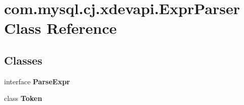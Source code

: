 \hypertarget{classcom_1_1mysql_1_1cj_1_1xdevapi_1_1_expr_parser}{}\section{com.\+mysql.\+cj.\+xdevapi.\+Expr\+Parser Class Reference}
\label{classcom_1_1mysql_1_1cj_1_1xdevapi_1_1_expr_parser}
\subsection*{Classes}
\begin{DoxyCompactItemize}
\item 
interface {\bfseries Parse\+Expr}
\item 
class {\bfseries Token}
\end{DoxyCompactItemize}
